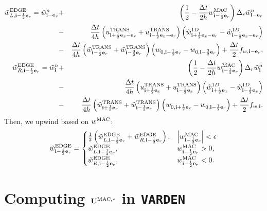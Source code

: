 \documentclass[11pt]{article}
\def\half  {\frac{1}{2}}
\def\dt    {\Delta t}
\def\edge  {\rm EDGE}
\def\mac   {\rm MAC}
\def\trans {\rm TRANS}
\def\eb    {{\bf e}}
\def\ib    {{\bf i}}
\def\Ub    {{\bf U}}
\def\wt    {\tilde{w}}
\begin{document}
\begin{eqnarray}
\wt_{L,\ib-\half\eb_r}^{\edge} = \wt_{\ib-\eb_r}^n &+& \left(\half - \frac{\dt}{2h}w_{\ib-\half\eb_r}^{\mac}\right)\Delta_r \wt_{\ib-\eb_r}^n \nonumber \\
&-& \frac{\dt}{4h}\left(u_{\ib+\half\eb_x-\eb_r}^{\trans}+u_{\ib-\half\eb_x-\eb_r}^{\trans}\right)\left(\wt_{\ib+\half\eb_x-\eb_r}^{1D} - \wt_{\ib-\half\eb_x-\eb_r}^{1D}\right) \nonumber \\
&-& \frac{\dt}{4h}\left(\wt_{\ib-\half\eb_r}^{\trans}+\wt_{\ib-\frac{3}{2}\eb_r}^{\trans}\right)\left(w_{0,\ib-\half\eb_r}-w_{0,\ib-\frac{3}{2}\eb_r}\right) + \frac{\dt}{2}f_{w,\ib-\eb_r}, \label{wt_L r-edge} \\
\wt_{R,\ib-\half\eb_r}^{\edge} = \wt_{\ib}^n &+& \left(\half - \frac{\dt}{2h}w_{\ib-\half\eb_r}^{\mac}\right)\Delta_r \wt_{\ib}^n \nonumber \\
&-& \frac{\dt}{4h}\left(u_{\ib+\half\eb_x}^{\trans}+u_{\ib-\half\eb_x}^{\trans}\right)\left(\wt_{\ib+\half\eb_x}^{1D} - \wt_{\ib-\half\eb_x}^{1D}\right) \nonumber \\
&-& \frac{\dt}{4h}\left(\wt_{\ib+\half\eb_r}^{\trans}+\wt_{\ib-\half\eb_r}^{\trans}\right)\left(w_{0,\ib+\half\eb_r}-w_{0,\ib-\half\eb_r}\right) + \frac{\dt}{2}f_{w,\ib}. \label{wt_R r-edge}
\end{eqnarray}
Then, we upwind based on $w^{\mac}$:
\begin{equation}
\wt_{\ib-\half\eb_r}^{\edge} =
\begin{cases}
\half\left(\wt_{L,\ib-\half\eb_r}^{\edge} + \wt_{R,\ib-\half\eb_r}^{\edge}\right), & \left|w^{\mac}_{\ib-\half\eb_r}\right| < \epsilon \\
\wt_{L,\ib-\half\eb_r}^{\edge}, & w^{\mac}_{\ib-\half\eb_r} > 0, \\
\wt_{R,\ib-\half\eb_r}^{\edge}, & w^{\mac}_{\ib-\half\eb_r} < 0.
\end{cases}
\end{equation}
\cleardoublepage
\section{Computing $\Ub^{\mac,*}$ in {\tt VARDEN}}
\end{document}
